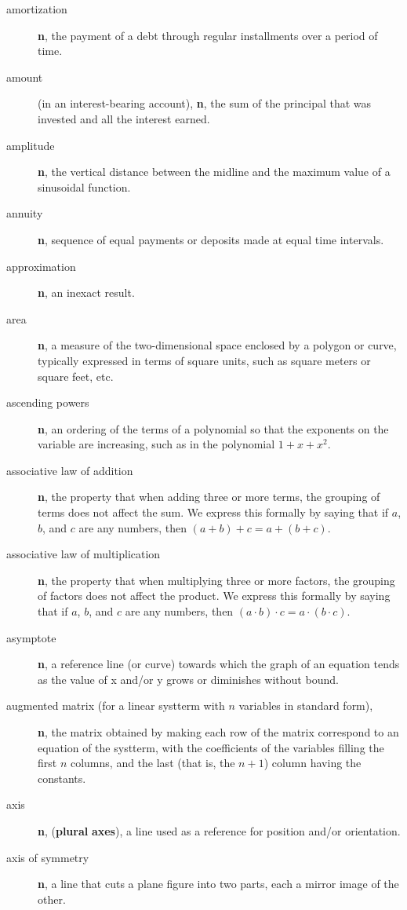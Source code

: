 \documentclass[10pt,]{book}
\newcommand{\terminology}[1]{\textbf{#1}}
\theoremstyle{plain}
\theoremstyle{definition}
\theoremstyle{definition}
\theoremstyle{definition}
\numberwithin{equation}{part}
\begin{document}
\begin{description}
\item[{amortization}]\hypertarget{li-462}{}\terminology{n}, the payment of a debt through regular installments over a period of time.%
\item[{amount}]\hypertarget{li-463}{}(in an interest-bearing account), \terminology{n}, the sum of the principal that was invested and all the interest earned.%
\item[{amplitude}]\hypertarget{li-464}{}\terminology{n}, the vertical distance between the midline and the maximum value of a sinusoidal function.%
\item[{annuity}]\hypertarget{li-465}{}\terminology{n}, sequence of equal payments or deposits made at equal time intervals.%
\item[{approximation}]\hypertarget{li-466}{}\terminology{n}, an inexact result.%
\item[{area}]\hypertarget{li-467}{}\terminology{n}, a measure of the two-dimensional space enclosed by a polygon or curve, typically expressed in terms of square units, such as square meters or square feet, etc.%
\item[{ascending powers}]\hypertarget{li-468}{}\terminology{n}, an ordering of the terms of a polynomial so that the exponents on the variable are increasing, such as in the polynomial \(1 + x + x^2\).%
\item[{associative law of addition}]\hypertarget{li-469}{}\terminology{n}, the property that when adding three or more terms, the grouping of terms does not affect the sum. We express this formally by saying that if \(a\), \(b\), and \(c\) are any numbers, then \((a + b) + c = a + (b + c)\).%
\item[{associative law of multiplication}]\hypertarget{li-470}{}\terminology{n}, the property that when multiplying three or more factors, the grouping of factors does not affect the product. We express this formally by saying that if \(a\), \(b\), and \(c\) are any numbers, then \((a \cdot b) \cdot c = a \cdot (b \cdot c)\).%
\item[{asymptote}]\hypertarget{li-471}{}\terminology{n}, a reference line (or curve) towards which the graph of an equation tends as the value of x and/or y grows or diminishes without bound.%
\item[{augmented matrix (for a linear systterm with \(n\) variables in standard form),}]\hypertarget{li-472}{}\terminology{n}, the matrix obtained by making each row of the matrix correspond to an equation of the systterm, with the coefficients of the variables filling the first \(n\) columns, and the last (that is, the \(n + 1\)) column having the constants.%
\item[{axis}]\hypertarget{li-473}{}\terminology{n}, (\terminology{plural} \terminology{axes}), a line used as a reference for position and/or orientation.%
\item[{axis of symmetry}]\hypertarget{li-474}{}\terminology{n}, a line that cuts a plane figure into two parts, each a mirror image of the other.%
\end{description}
%
\typeout{************************************************}
\typeout{************************************************}
\end{document}
